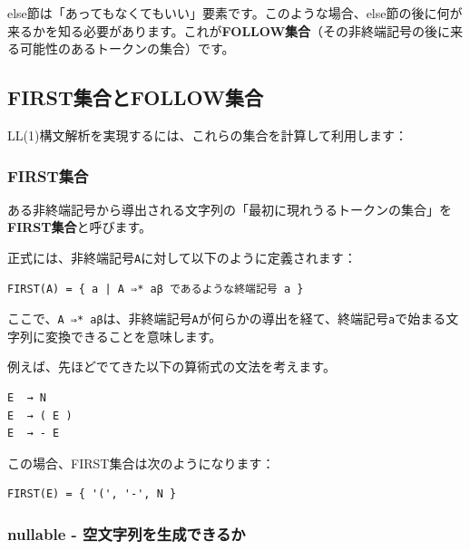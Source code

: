 else節は「あってもなくてもいい」要素です。このような場合、else節の後に何が来るかを知る必要があります。これが\textbf{FOLLOW集合}（その非終端記号の後に来る可能性のあるトークンの集合）です。

\hypertarget{chapter5-firstux96c6ux5408ux3068followux96c6ux5408}{%
\subsection{FIRST集合とFOLLOW集合}\label{chapter5-firstux96c6ux5408ux3068followux96c6ux5408}}

LL(1)構文解析を実現するには、これらの集合を計算して利用します：

\hypertarget{chapter5-firstux96c6ux5408}{%
\subsubsection{FIRST集合}\label{chapter5-firstux96c6ux5408}}

ある非終端記号から導出される文字列の「最初に現れうるトークンの集合」を\textbf{FIRST集合}と呼びます。

正式には、非終端記号\texttt{A}に対して以下のように定義されます：

\begin{verbatim}
FIRST(A) = { a | A ⇒* aβ であるような終端記号 a }
\end{verbatim}

ここで、\texttt{A\ ⇒*\ aβ}は、非終端記号\texttt{A}が何らかの導出を経て、終端記号\texttt{a}で始まる文字列に変換できることを意味します。

例えば、先ほどでてきた以下の算術式の文法を考えます。

\begin{verbatim}
E  → N
E  → ( E )
E  → - E
\end{verbatim}

この場合、FIRST集合は次のようになります：

\begin{verbatim}
FIRST(E) = { '(', '-', N }
\end{verbatim}

\hypertarget{chapter5-nullable---ux7a7aux6587ux5b57ux5217ux3092ux751fux6210ux3067ux304dux308bux304b}{%
\subsubsection{nullable -
空文字列を生成できるか}\label{chapter5-nullable---ux7a7aux6587ux5b57ux5217ux3092ux751fux6210ux3067ux304dux308bux304b}}

